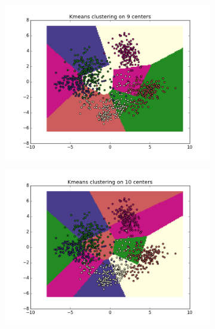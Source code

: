 \documentclass{article}
\begin{document}
\begin{center}
\begin{figure}
\centering  
        \begin{subfigure}[b]{0.48\textwidth}
                \centering
                \includegraphics[width=\linewidth]{figure_7}
        \end{subfigure}\hfill
        \begin{subfigure}[b]{0.48\textwidth}
                \centering
                \includegraphics[width=\linewidth]{figure_8}
        \end{subfigure}
        \label{fig:4}
\end{figure}
\end{center}			 
			
				
				
\end{document}

